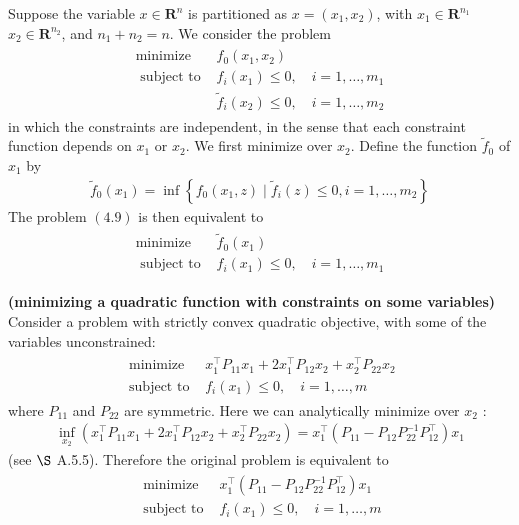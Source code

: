 \documentclass{article}
\newcommand{\bfs}[1]{\textbf{({#1}) }}
\begin{document}
Suppose the variable $x \in \mathbf{R}^{n}$ is partitioned as $x=\left(x_{1}, x_{2}\right)$, with $x_{1} \in \mathbf{R}^{n_{1}}$ $x_{2} \in \mathbf{R}^{n_{2}}$, and $n_{1}+n_{2}=n .$ We consider the problem
\begin{align*}
\begin{array}{ll}
\operatorname{minimize} & f_{0}\left(x_{1}, x_{2}\right) \\
\text { subject to } & f_{i}\left(x_{1}\right) \leq 0, \quad i=1, \ldots, m_{1} \\
& \tilde{f}_{i}\left(x_{2}\right) \leq 0, \quad i=1, \ldots, m_{2}
\end{array}
\end{align*}
in which the constraints are independent, in the sense that each constraint function depends on $x_{1}$ or $x_{2} .$ We first minimize over $x_{2} .$ Define the function $\tilde{f}_{0}$ of $x_{1}$ by
\begin{align*}
\tilde{f}_{0}\left(x_{1}\right)=\inf \left\{f_{0}\left(x_{1}, z\right) \mid \tilde{f}_{i}(z) \leq 0, i=1, \ldots, m_{2}\right\}
\end{align*}
The problem $(4.9)$ is then equivalent to
\begin{align*}
\begin{array}{ll}
\operatorname{minimize} & \tilde{f}_{0}\left(x_{1}\right) \\
\text { subject to } & f_{i}\left(x_{1}\right) \leq 0, \quad i=1, \ldots, m_{1}
\end{array}
\end{align*}

\begin{exma}\bfs{minimizing a quadratic function with constraints on some variables}
Consider a problem with strictly convex quadratic objective, with some of the variables unconstrained:
\begin{align*}
\begin{array}{ll}
\text { minimize } & x_{1}^{\top} P_{11} x_{1}+2 x_{1}^{\top} P_{12} x_{2}+x_{2}^{\top} P_{22} x_{2} \\
\text { subject to } & f_{i}\left(x_{1}\right) \leq 0, \quad i=1, \ldots, m
\end{array}
\end{align*}
where $P_{11}$ and $P_{22}$ are symmetric. Here we can analytically minimize over $x_{2}$ :
\begin{align*}
\inf _{x_{2}}\left(x_{1}^{\top} P_{11} x_{1}+2 x_{1}^{\top} P_{12} x_{2}+x_{2}^{\top} P_{22} x_{2}\right)=x_{1}^{\top}\left(P_{11}-P_{12} P_{22}^{-1} P_{12}^{\top}\right) x_{1}
\end{align*}
(see $\S$ A.5.5). Therefore the original problem is equivalent to
\begin{align*}
\begin{array}{ll}
\text { minimize } & x_{1}^{\top}\left(P_{11}-P_{12} P_{22}^{-1} P_{12}^{\top}\right) x_{1} \\
\text { subject to } & f_{i}\left(x_{1}\right) \leq 0, \quad i=1, \ldots, m
\end{array}
\end{align*}
\end{exma}
\end{document}
